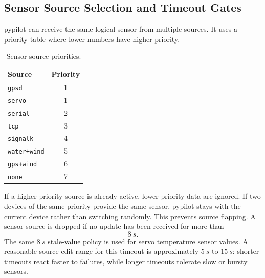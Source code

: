 \documentclass[10pt,twocolumn]{article}
\begin{document}
\subsection{Sensor Source Selection and Timeout Gates}
pypilot can receive the same logical sensor from multiple sources.  It
uses a priority table where lower numbers have higher priority.
\begin{table}[!t]
\centering
\caption{Sensor source priorities.}
\label{tab:pypilot-source-priority}
\begin{tabular}{lc}
\toprule
Source & Priority \\
\midrule
\texttt{gpsd} & 1 \\
\texttt{servo} & 1 \\
\texttt{serial} & 2 \\
\texttt{tcp} & 3 \\
\texttt{signalk} & 4 \\
\texttt{water+wind} & 5 \\
\texttt{gps+wind} & 6 \\
\texttt{none} & 7 \\
\bottomrule
\end{tabular}
\end{table}
If a higher-priority source is already active, lower-priority data are
ignored.  If two devices of the same priority provide the same sensor,
pypilot stays with the current device rather than switching randomly.
This prevents source flapping.
A sensor source is dropped if no update has been received for more than
\[
\SI{8}{s}.
\]
The same \(\SI{8}{s}\) stale-value policy is used for servo temperature
sensor values.  A reasonable source-edit range for this timeout is
approximately \(\SI{5}{s}\) to \(\SI{15}{s}\): shorter timeouts react
faster to failures, while longer timeouts tolerate slow or bursty sensors.
\end{document}
